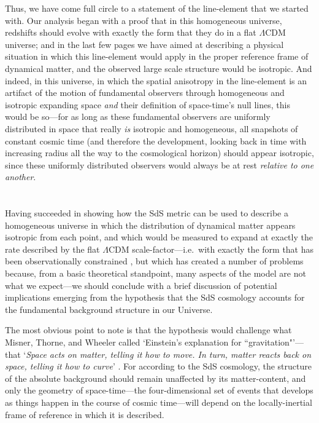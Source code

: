 \documentclass[11pt]{article}
\begin{document}
\begin{appendix}
Thus, we have come full circle to a statement of the line-element that we started with. Our analysis began with a proof that in this homogeneous universe, redshifts should evolve with exactly the form that they do in a flat $\Lambda$CDM universe; and in the last few pages we have aimed at describing a physical situation in which this line-element would apply in the proper reference frame of dynamical matter, and the observed large scale structure would be isotropic. And indeed, in this universe, in which the spatial anisotropy in the line-element is an artifact of the motion of fundamental observers through homogeneous and isotropic expanding space \textit{and} their definition of space-time's null lines, this would be so---for as long as these fundamental observers are uniformly distributed in space that really \textit{is} isotropic and homogeneous, all snapshots of constant cosmic time (and therefore the development, looking back in time with increasing radius all the way to the cosmological horizon) should appear isotropic, since these uniformly distributed observers would always be at rest \textit{relative to one another}.\\\\\\
Having succeeded in showing how the SdS metric can be used to describe a homogeneous universe in which the distribution of dynamical matter appears isotropic from each point, and which would be measured to expand at exactly the rate described by the flat $\Lambda$CDM scale-factor---i.e.\ with exactly the form that has been observationally constrained \cite{SNe Ia}, but which has created a number of problems because, from a basic theoretical standpoint, many aspects of the model are not what we expect---we should conclude with a brief discussion of potential implications emerging from the hypothesis that the SdS cosmology accounts for the fundamental background structure in our Universe.

The most obvious point to note is that the hypothesis would challenge what Misner, Thorne, and Wheeler called `Einstein's explanation for ``gravitation"'---that `\textit{Space acts on matter, telling it how to move. In turn, matter reacts back on space, telling it how to curve}' \cite{Misner1973}. For according to the SdS cosmology, the structure of the absolute background should remain unaffected by its matter-content, and only the geometry of space-time---the four-dimensional set of events that develops as things happen in the course of cosmic time---will depend on the locally-inertial frame of reference in which it is described.


\end{appendix}
\end{document}
